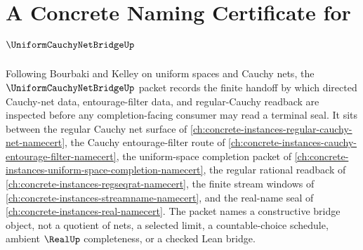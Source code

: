\chapter{A Concrete Naming Certificate for $\UniformCauchyNetBridgeUp$}
\label{ch:concrete-instances-uniform-cauchy-net-bridge-namecert}

Following Bourbaki and Kelley on uniform spaces and Cauchy nets, the $\UniformCauchyNetBridgeUp$ packet records the finite handoff by which directed Cauchy-net data, entourage-filter data, and regular-Cauchy readback are inspected before any completion-facing consumer may read a terminal seal. It sits between the regular Cauchy net surface of \autoref{ch:concrete-instances-regular-cauchy-net-namecert}, the Cauchy entourage-filter route of \autoref{ch:concrete-instances-cauchy-entourage-filter-namecert}, the uniform-space completion packet of \autoref{ch:concrete-instances-uniform-space-completion-namecert}, the regular rational readback of \autoref{ch:concrete-instances-regseqrat-namecert}, the finite stream windows of \autoref{ch:concrete-instances-streamname-namecert}, and the real-name seal of \autoref{ch:concrete-instances-real-namecert}. The packet names a constructive bridge object, not a quotient of nets, a selected limit, a countable-choice schedule, ambient $\RealUp$ completeness, or a checked Lean bridge.

